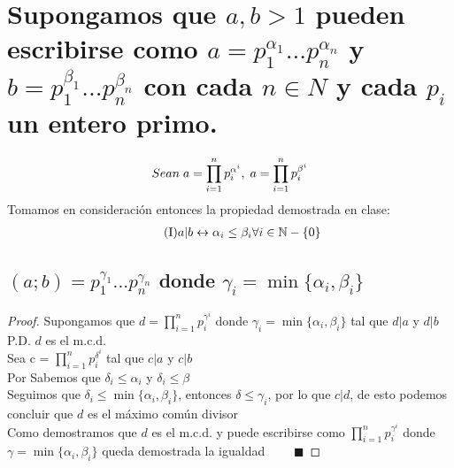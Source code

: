 \section{Supongamos que $a,b > 1$ pueden escribirse como $a = p_1^{\alpha_1}...p_n^{\alpha_n}$ y $ b =p_1^{\beta_1}...p_n^{\beta_n}$ con cada $n \in N$ y cada $p_i$ un entero primo.}
    \begin{align}
        \notag Sean \; a = \prod_{i=1}^{n} p_i^{\alpha^i}, \; a = \prod_{i=1}^{n} p_i^{\beta^i}
    \end{align}
    Tomamos en consideración entonces la propiedad demostrada en clase: 
    \begin{align}
        \tag{\MakeUppercase{\romannumeral 1}}a | b \leftrightarrow \alpha_i \leq \beta_i \forall i \in \mathbb{N}-\{0\}
    \end{align}
    \subsection{$(a;b) = p_1^{\gamma_1}...p_n^{\gamma_n}$ donde $\gamma_i = \min\{\alpha_i,\beta_i\} $}
        \begin{proof}
        Supongamos que $d = \displaystyle \prod_{i=1}^{n} p_i^{\gamma^i}$ donde $\gamma_i = \min\{\alpha_i,\beta_i\}$  tal que $d|a$ y $d|b$ \\
        P.D. $d$ es el m.c.d. \\
        Sea c = $\displaystyle \prod_{i=1}^{n} p_i^{\delta^i}$ tal que $c|a$ y $c|b$ \\
        Por \MakeUppercase{} Sabemos que $\delta_i \leq \alpha_i$ y $\delta_i \leq \beta$ \\
        Seguimos que $\delta_i \leq \min\{\alpha_i,\beta_i\}$, entonces $\delta \leq \gamma_i $, por lo que $c|d$, de esto podemos concluir que $d$ es el máximo común divisor \\
        Como demostramos que $d$ es el m.c.d. y puede escribirse como $\displaystyle \prod_{i=1}^{n} p_i^{\gamma^i}$ donde $\gamma = \min\{\alpha_i,\beta_i\}$ queda demostrada la igualdad $\qquad \blacksquare$
        \end{proof}
